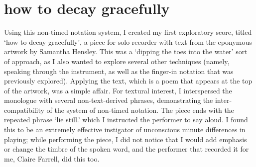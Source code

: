 \section{how to decay gracefully}

Using this non-timed notation system, I created my first exploratory score, titled `how to decay gracefully', a piece for solo recorder with text from the eponymous artwork by Samantha Hensley.\autocite{TODO: add Hensley}
This was a `dipping the toes into the water' sort of approach, as I also wanted to explore several other techniques (namely, speaking through the instrument, as well as the finger-in notation that was previously explored). 
Applying the text, which is a poem that appears at the top of the artwork, was a simple affair. 
For textural interest, I interspersed the monologue with several non-text-derived phrases, demonstrating the inter-compatibility of the system of non-timed notation.
The piece ends with the repeated phrase `lie still.' which I instructed the performer to say aloud. 
I found this to be an extremely effective instigator of unconscious minute differences in playing; 
while performing the piece, I did not notice that I would add emphasis or change the timbre of the spoken word, and the performer that recorded it for me, Claire Farrell, did this too.
